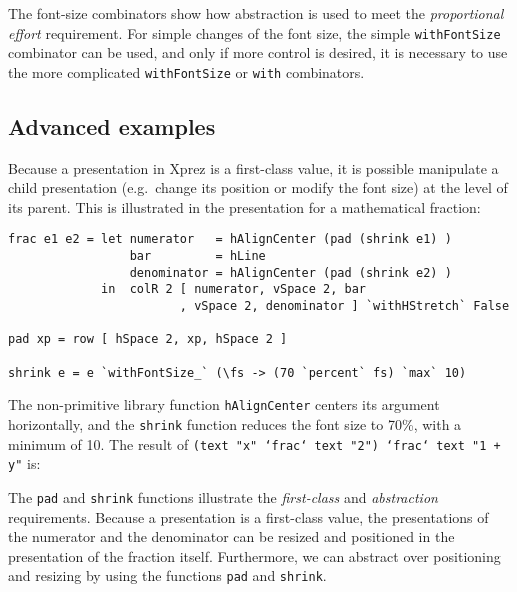 The font-size combinators show how abstraction is used to meet the {\em proportional effort} requirement. For simple changes of the font size, the simple \texttt{withFontSize} combinator can be used, and only if more control is desired, it is necessary to use the more complicated \texttt{withFontSize} or \texttt{with} combinators.



\fromHere

%																
\subsection{Advanced examples}

Because a presentation in {\sc Xprez} is a first-class value, it is possible manipulate a child presentation (e.g.\ change its position or modify the font size) at the level of its parent.  This is illustrated in the presentation for a mathematical fraction: 

\begin{small}
\begin{verbatim}
frac e1 e2 = let numerator   = hAlignCenter (pad (shrink e1) )
                 bar         = hLine
                 denominator = hAlignCenter (pad (shrink e2) )
             in  colR 2 [ numerator, vSpace 2, bar
                        , vSpace 2, denominator ] `withHStretch` False

pad xp = row [ hSpace 2, xp, hSpace 2 ]

shrink e = e `withFontSize_` (\fs -> (70 `percent` fs) `max` 10)
\end{verbatim}
\end{small}

The non-primitive library function \texttt{hAlignCenter} centers its argument horizontally, and the \texttt{shrink} function reduces the font size to 70\%, with a minimum of 10. The result of \texttt{(text "x" `frac` text "2") `frac` text "1 + y"} is:

\begin{center}
\end{center}

The \texttt{pad} and \texttt{shrink} functions illustrate the {\em first-class} and {\em abstraction} requirements. Because a presentation is a first-class value, the presentations of the numerator and the denominator can be resized and positioned in the presentation of the fraction itself. Furthermore, we can abstract over positioning and resizing by using the functions \texttt{pad} and \texttt{shrink}. 

